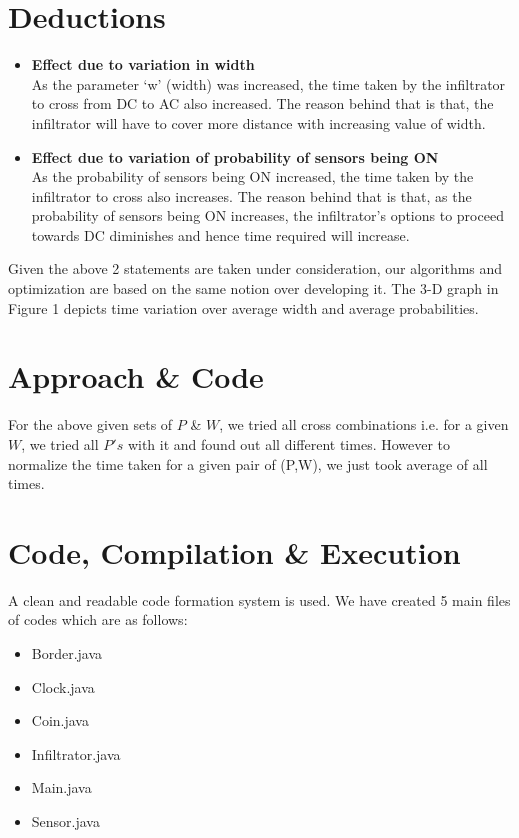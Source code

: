 \documentclass[12pt]{article}
\begin{document}

\section{Deductions}

\begin{itemize}
    \item \textbf{Effect due to variation in width} \\
    As the parameter ‘w’ (width) was increased, the time taken by the infiltrator to cross from DC to AC also increased. The reason behind that is that, the infiltrator will have to cover more distance with increasing value of width.
    \item \textbf{Effect due to variation of probability of sensors being ON} \\
    As the probability of sensors being ON increased, the time taken by the infiltrator to cross also increases. The reason behind that is that, as the probability of sensors being ON increases, the infiltrator's options to proceed towards DC diminishes and hence time required will increase.
\end{itemize}

Given the above 2 statements are taken under consideration, our algorithms and optimization are based on the same notion over developing it. The 3-D graph in Figure 1 depicts time variation over average width and average probabilities.

\section{Approach \& Code}
For the above given sets of $P$ \& $W$, we tried all cross combinations i.e. for a given $W$, we tried all $P's$ with it and found out all different times. However to normalize the time taken for a given pair of (P,W), we just took average of all times.


\section{Code, Compilation \& Execution}
A clean and readable code formation system is used. We have created 5 main files of codes which are as follows:
    \begin{itemize}
        \item Border.java
        \item Clock.java
        \item Coin.java
        \item Infiltrator.java
        \item Main.java
        \item Sensor.java
    \end{itemize}
\end{document}
